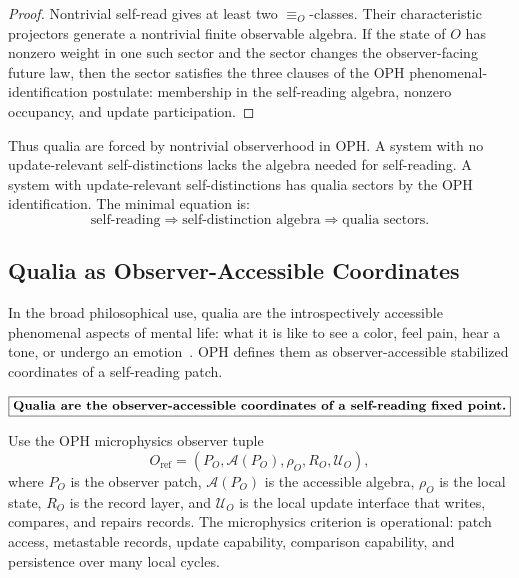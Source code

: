 \documentclass[11pt]{article}
\theoremstyle{remark}
\theoremstyle{plain}
\begin{document}
\begin{proof}
Nontrivial self-read gives at least two \(\equiv_O\)-classes. Their characteristic projectors generate a nontrivial finite observable algebra. If the state of \(O\) has nonzero weight in one such sector and the sector changes the observer-facing future law, then the sector satisfies the three clauses of the OPH phenomenal-identification postulate: membership in the self-reading algebra, nonzero occupancy, and update participation.
\end{proof}

Thus qualia are forced by nontrivial observerhood in OPH. A system with no update-relevant self-distinctions lacks the algebra needed for self-reading. A system with update-relevant self-distinctions has qualia sectors by the OPH identification. The minimal equation is:
\[
\boxed{
\text{self-reading}
\Longrightarrow
\text{self-distinction algebra}
\Longrightarrow
\text{qualia sectors}.
}
\]

\subsection{Qualia as Observer-Accessible Coordinates}

In the broad philosophical use, qualia are the introspectively accessible phenomenal aspects of mental life: what it is like to see a color, feel pain, hear a tone, or undergo an emotion~\cite{SEPQualia}. OPH defines them as observer-accessible stabilized coordinates of a self-reading patch.

\[
\boxed{
\text{\bfseries Qualia are the observer-accessible coordinates of a self-reading fixed point.}
}
\]

Use the OPH microphysics observer tuple
\[
O_{\mathrm{ref}}=(P_O,\mathcal A(P_O),\rho_O,R_O,\mathcal U_O),
\]
where \(P_O\) is the observer patch, \(\mathcal A(P_O)\) is the accessible algebra, \(\rho_O\) is the local state, \(R_O\) is the record layer, and \(\mathcal U_O\) is the local update interface that writes, compares, and repairs records. The microphysics criterion is operational: patch access, metastable records, update capability, comparison capability, and persistence over many local cycles.
\end{document}
